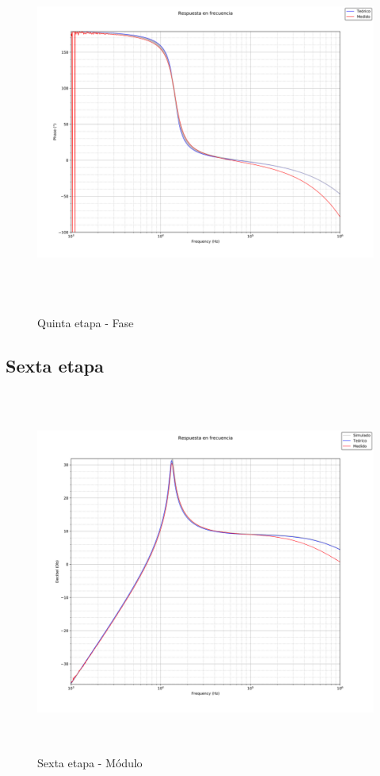  \begin{figure}[H] %
	\centering
	\includegraphics[width=12cm,height=12cm,keepaspectratio]{../Imagenes/FIFTH_PHA.png}
	\caption{Quinta etapa - Fase}
	\label{5P}
\end{figure}

\subsection{Sexta etapa}

 \begin{figure}[H] %
	\centering
	\includegraphics[width=12cm,height=12cm,keepaspectratio]{../Imagenes/UNIVERSAL_MOD.png}
	\caption{Sexta etapa - M\'odulo}
	\label{univmod}
\end{figure}

